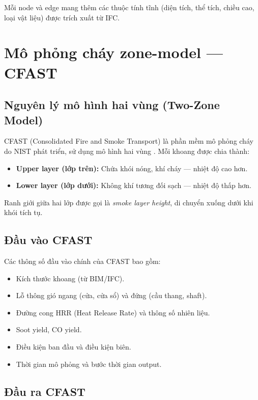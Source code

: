 Mỗi node và edge mang thêm các thuộc tính tĩnh (diện tích, thể tích, chiều cao, loại vật liệu) được trích xuất từ IFC.

\section{Mô phỏng cháy zone-model — CFAST}
\label{sec:cfast}

\subsection{Nguyên lý mô hình hai vùng (Two-Zone Model)}

CFAST (Consolidated Fire and Smoke Transport) là phần mềm mô phỏng cháy do NIST phát triển, sử dụng mô hình hai vùng \cite{cfast_guide,cfast_tech}. Mỗi khoang được chia thành:
\begin{itemize}
  \item \textbf{Upper layer (lớp trên):} Chứa khói nóng, khí cháy — nhiệt độ cao hơn.
  \item \textbf{Lower layer (lớp dưới):} Không khí tương đối sạch — nhiệt độ thấp hơn.
\end{itemize}

Ranh giới giữa hai lớp được gọi là \textit{smoke layer height}, di chuyển xuống dưới khi khói tích tụ.

\subsection{Đầu vào CFAST}

Các thông số đầu vào chính của CFAST bao gồm:
\begin{itemize}
  \item Kích thước khoang (từ BIM/IFC).
  \item Lỗ thông gió ngang (cửa, cửa sổ) và đứng (cầu thang, shaft).
  \item Đường cong HRR (Heat Release Rate) và thông số nhiên liệu.
  \item Soot yield, CO yield.
  \item Điều kiện ban đầu và điều kiện biên.
  \item Thời gian mô phỏng và bước thời gian output.
\end{itemize}

\subsection{Đầu ra CFAST}

